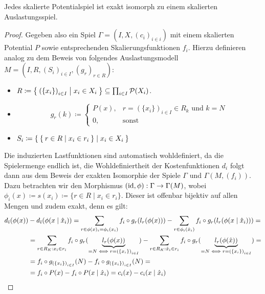 \begin{satz}
	Jedes skalierte Potentialspiel ist exakt isomorph zu einem skalierten Auslastungsspiel.
\end{satz}

\begin{proof}
	Gegeben also ein Spiel $\Gamma = (I, X, (c_i)_{i\in i})$ mit einem skalierten Potential $P$ sowie entsprechenden Skalierungsfunktionen $f_i$. Hierzu definieren analog zu dem Beweis von  folgendes Auslastungsmodell $M = (I, R, (S_i)_{i \in I}, (g_r)_{r \in R})$:
	\begin{itemize}
		\item $R \coloneqq \Set{\left(\{x_i\}\right)_{i \in I} | x_i \in X_i } \subseteq \prod_{i \in I}\mathcal{P}(X_i)$.
		\item \[g_r(k) \coloneqq 
		\begin{cases}
		P(x), 					&r = \left(\{x_i\}\right)_{i \in I} \in R_k 													\text{ und } k=N \\
		0,						&\text{sonst}
		\end{cases}\]
		\item $S_i \coloneqq \Set{ \Set{r \in R | x_i \in r_i} | x_i \in X_i }$
	\end{itemize}
	Die induzierten Lastfunktionen sind automatisch wohldefiniert, da die Spielermenge endlich ist, die Wohldefiniertheit der Kostenfunktionen $d_i$ folgt dann aus dem Beweis der exakten Isomorphie der Spiele $\Gamma$ und $\Gamma(M, (f_i))$. Dazu betrachten wir den Morphismus $(\mathrm{id}, \phi): \Gamma \to \Gamma(M)$, wobei $\phi_i(x) \coloneqq s(x_i) \coloneqq \{r \in R \mid x_i \in r_i\}$. Dieser ist offenbar bijektiv auf allen Mengen und zudem exakt, denn es gilt:
	\begin{align*}
	d_{\hat{\imath}}(\phi(x)) &- d_{\hat{\imath}}(\phi(x \mid \hat{x}_i)) =\sum_{r \in \phi(x)_{\hat{\imath}} = \phi_{\hat{\imath}}(x_{\hat{\imath}})} f_i \circ g_r(l_r(\phi(x))) - \sum_{r \in \phi_{\hat{\imath}}(\hat{x}_{\hat{\imath}})} f_i \circ g_r(l_r(\phi(x \mid \hat{x}_i))) = \\
	&=\sum_{r \in R_K: x_{\hat{\imath}} \in r_{\hat{\imath}}} f_i \circ g_r(\underbrace{l_r(\phi(x))}_{= N \iff r = \left(\{x_i\}\right)_{i \in I}}) -
	\sum_{r \in R_K: \hat{x}_{\hat{\imath}} \in r_{\hat{\imath}}} f_i \circ g_r(\underbrace{l_r(\phi(\hat{x}))}_{= N \iff r = \left(\{x_i\}\right)_{i \in I}}) = \\
	&=f_i \circ g_{\left(\{x_i\}\right)_{i \in I}}(N) - f_i \circ g_{\left(\{x_i\}\right)_{i \in I}}(N) = \\
	&=f_i \circ P(x) - f_i \circ P(x \mid \hat{x}_i) = c_i(x) - c_i(x \mid \hat{x}_i)	\qedhere							
	\end{align*}
\end{proof}

